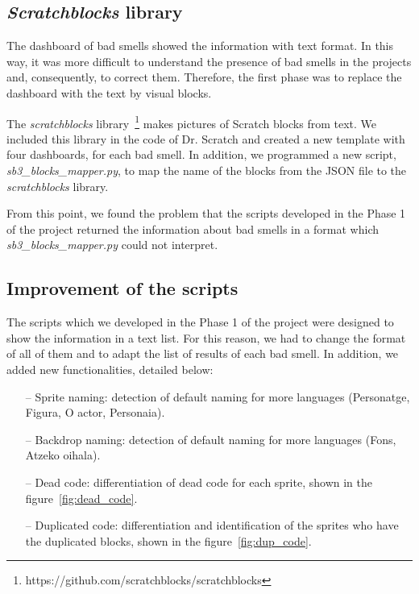 \subsection{\textit{Scratchblocks} library}
\label{subsec:scratchblocks}

The dashboard of bad smells showed the information with text format. In this way, it was more difficult to understand the presence of bad smells in the projects and, consequently, to correct them. Therefore, the first phase was to replace the dashboard with the text by visual blocks.

The \textit{scratchblocks} library~\footnote{https://github.com/scratchblocks/scratchblocks} makes pictures of Scratch blocks from text. We included this library in the code of Dr. Scratch and created a new template with four dashboards, for each bad smell. In addition, we programmed a new script, \textit{sb3\_blocks\_mapper.py}, to map the name of the blocks from the JSON file to the \textit{scratchblocks} library.

From this point, we found the problem that the scripts developed in the Phase 1 of the project returned the information about bad smells in a format which \textit{sb3\_blocks\_mapper.py} could not interpret. 

\subsection{Improvement of the scripts}
\label{subsec:improvement_scripts}

The scripts which we developed in the Phase 1 of the project were designed to show the information in a text list. For this reason, we had to change the format of all of them and to adapt the list of results of each bad smell. In addition, we added new functionalities, detailed below:

\begin{itemize}
    \item[--] Sprite naming: detection of default naming for more languages (Personatge, Figura, O actor, Personaia).
    \item[--] Backdrop naming: detection of default naming for more languages (Fons, Atzeko oihala).
    \item[--] Dead code: differentiation of dead code for each sprite, shown in the figure~\ref{fig:dead_code}.
    \item[--] Duplicated code: differentiation and identification of the sprites who have the duplicated blocks, shown in the figure~\ref{fig:dup_code}.
\end{itemize}

